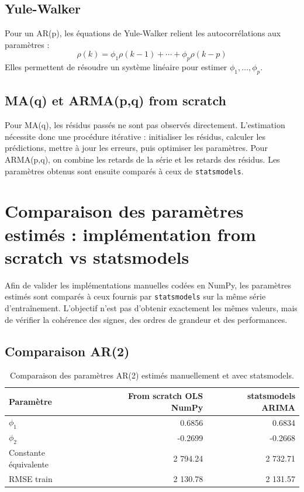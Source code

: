 \documentclass[12pt,a4paper]{report}
\begin{document}
\subsection{Yule-Walker}
Pour un AR(p), les équations de Yule-Walker relient les autocorrélations aux paramètres :
\[
\rho(k) = \phi_1\rho(k-1)+\cdots+\phi_p\rho(k-p)
\]
Elles permettent de résoudre un système linéaire pour estimer $\phi_1, \ldots, \phi_p$.

\subsection{MA(q) et ARMA(p,q) from scratch}
Pour MA(q), les résidus passés ne sont pas observés directement. L'estimation nécessite donc une procédure itérative : initialiser les résidus, calculer les prédictions, mettre à jour les erreurs, puis optimiser les paramètres. Pour ARMA(p,q), on combine les retards de la série et les retards des résidus. Les paramètres obtenus sont ensuite comparés à ceux de \texttt{statsmodels}.


\section{Comparaison des paramètres estimés : implémentation from scratch vs statsmodels}
Afin de valider les implémentations manuelles codées en NumPy, les paramètres estimés sont comparés à ceux fournis par \texttt{statsmodels} sur la même série d'entraînement. L'objectif n'est pas d'obtenir exactement les mêmes valeurs, mais de vérifier la cohérence des signes, des ordres de grandeur et des performances.

\subsection{Comparaison AR(2)}
\begin{table}[H]
\centering
\begin{tabular}{lrr}
\toprule
Paramètre & From scratch OLS NumPy & statsmodels ARIMA \\
\midrule
$\phi_1$ & 0.6856 & 0.6834 \\
$\phi_2$ & -0.2699 & -0.2668 \\
Constante équivalente & 2 794.24 & 2 732.71 \\
RMSE train & 2 130.78 & 2 131.57 \\
\bottomrule
\end{tabular}
\caption{Comparaison des paramètres AR(2) estimés manuellement et avec statsmodels.}
\end{table}
\end{document}
